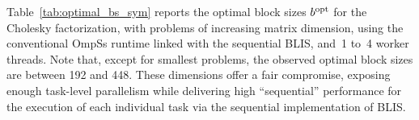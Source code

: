 Table~\ref{tab:optimal_bs_sym} reports the optimal block sizes $b^{\mbox{\rm \scriptsize opt}}$ 
for the Cholesky factorization, with problems of increasing matrix dimension, using the conventional
OmpSs runtime linked with the sequential BLIS, and~1 to~4 worker threads.
Note that, except for smallest problems, the observed optimal block sizes
are between 192 and 448. These dimensions offer a 
fair compromise, exposing enough task-level parallelism
while delivering high ``sequential'' performance for the execution of each individual task
via the sequential implementation of BLIS.

%

\newcommand{\ra}[1]{\renewcommand{\arraystretch}{#1}}
\newcommand{\ca}[1]{\renewcommand{\tabcolsep}{#1}}

\ra{1.2}
\ca{2pt}

